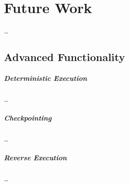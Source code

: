 
\chapter{Future Work}
\label{cha:futurework}
\ldots




\section{Advanced Functionality}
\label{sec:futurework_advancedfunctionality}

\paragraph{Deterministic Execution}
\label{par:futurework_advancedfunctionality_deterministicexecution}
\ldots

\paragraph{Checkpointing}
\label{par:futurework_advancedfunctionality_checkpointing}
\ldots

\paragraph{Reverse Execution}
\label{par:futurework_advancedfunctionality_reverseexecution}
\ldots